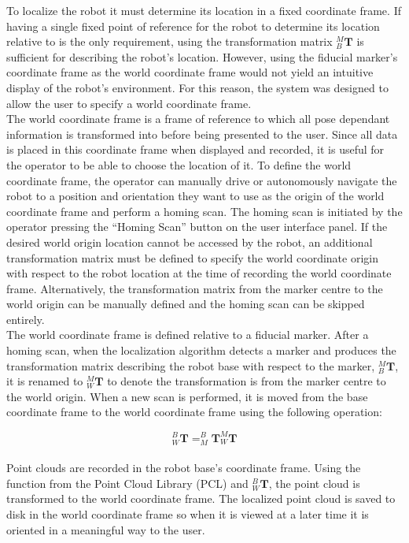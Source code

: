 To localize the robot it must determine its location in a fixed coordinate frame. If having a single fixed point of reference for the robot to determine its location relative to is the only requirement, using the transformation matrix $^{M}_{B}\mathbf{T}$ is sufficient for describing the robot's location. However, using the fiducial marker's coordinate frame as the world coordinate frame would not yield an intuitive display of the robot's environment. For this reason, the system was designed to allow the user to specify a world coordinate frame.\\

The world coordinate frame is a frame of reference to which all pose dependant information is transformed into before being presented to the user. Since all data is placed in this coordinate frame when displayed and recorded, it is useful for the operator to be able to choose the location of it. To define the world coordinate frame, the operator can manually drive or autonomously navigate the robot to a position and orientation they want to use as the origin of the world coordinate frame and perform a homing scan. The homing scan is initiated by the operator pressing the ``Homing Scan'' button on the user interface panel. If the desired world origin location cannot be accessed by the robot, an additional transformation matrix must be defined to specify the world coordinate origin with respect to the robot location at the time of recording the world coordinate frame. Alternatively, the transformation matrix from the marker centre to the world origin can be manually defined and the homing scan can be skipped entirely.\\

The world coordinate frame is defined relative to a fiducial marker. After a homing scan, when the localization algorithm detects a marker and produces the transformation matrix describing the robot base with respect to the marker, $^{M}_{B}\mathbf{T}$, it is renamed to $^{M}_{W}\mathbf{T}$ to denote the transformation is from the marker centre to the world origin. When a new scan is performed, it is moved from the base coordinate frame to the world coordinate frame using the following operation:

\begin{equation}
    ^{B}_{W}\mathbf{T} = ^{B}_{M}\mathbf{T}^{M}_{W}\mathbf{T}
\end{equation}\\

Point clouds are recorded in the robot base's coordinate frame. Using the function  from the Point Cloud Library (PCL) and $^{B}_{W}\mathbf{T}$, the point cloud is transformed to the world coordinate frame. The localized point cloud is saved to disk in the world coordinate frame so when it is viewed at a later time it is oriented in a meaningful way to the user.\\

